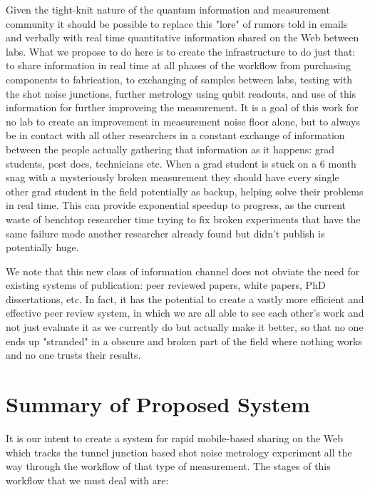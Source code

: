 \documentclass[11pt]{article}
\begin{document}
    Given the tight-knit nature of the quantum information and measurement community it should be possible to replace this "lore" of rumors told in emails and verbally with real time quantitative information shared on the Web between labs.  What we propose to do here is to create the infrastructure to do just that: to share information in real time at all phases of the workflow from purchasing components to fabrication, to exchanging of samples between labs, testing with the shot noise junctions, further metrology using qubit readouts, and use of this information for further improveing the measurement.  It is a goal of this work for no lab to create an improvement in measurement noise floor alone, but to always be in contact with all other researchers in a constant exchange of information between the people actually gathering that information as it happens: grad students, post docs, technicians etc.  When a grad student is stuck on a 6 month snag with a mysteriously broken measurement they should have every single other grad student in the field potentially as backup, helping solve their problems in real time.  This can provide exponential speedup to progress, as the current waste of benchtop researcher time trying to fix broken experiments that have the same failure mode another researcher already found but didn't publish is potentially huge.  




    We note that this new class of information channel does not obviate the need for existing systems of publication: peer reviewed papers, white papers, PhD dissertations, etc.  In fact, it has the potential to create a vastly more efficient and effective peer review system, in which we are all able to see each other's work and not just evaluate it as we currently do but actually make it better, so that no one ends up "stranded" in a obscure and broken part of the field where nothing works and no one trusts their results.  



\section{
Summary of Proposed System}




    It is our intent to create a system for rapid mobile-based sharing on the Web which tracks the tunnel junction based shot noise metrology experiment all the way through the workflow of that type of measurement.  The stages of this workflow that we must deal with are:
    
\end{document}
